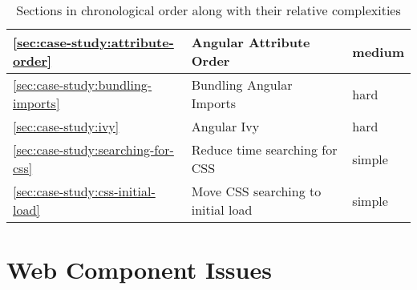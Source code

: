 \begin{table}[h]
\begin{tabularx}{\textwidth}{l|X|l}
		\ref{sec:case-study:attribute-order}        & Angular Attribute Order            & medium                       \\ \hline
		\ref{sec:case-study:bundling-imports}       & Bundling Angular Imports           & hard                         \\ \hline
		\ref{sec:case-study:ivy}                    & Angular Ivy                        & hard                         \\ \hline
		\ref{sec:case-study:searching-for-css}      & Reduce time searching for CSS      & simple                       \\ \hline
		\ref{sec:case-study:css-initial-load}       & Move CSS searching to initial load & simple                       \\
	\end{tabularx}
	\caption{Sections in chronological order along with their relative complexities}
	\label{tab:case-study:chronological-issues}
\end{table}

\section{Web Component Issues}

